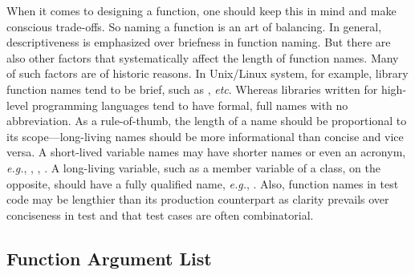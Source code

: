 When it comes to designing a function, one should keep this in mind and make conscious trade-offs.
So naming a function is an art of balancing.
In general, descriptiveness is emphasized over briefness in function naming.
But there are also other factors that systematically affect the length of function names.
Many of such factors are of historic reasons.
In Unix/Linux system, for example, library function names tend to be brief, such as , \textit{etc}.
Whereas libraries written for high-level programming languages tend to have
formal, full names with no abbreviation.
As a rule-of-thumb, the length of a name should be proportional to its scope---long-living names
should be more informational than concise and vice versa.
A short-lived variable names may have shorter names or even an acronym, \textit{e.g.},
, , .
A long-living variable, such as a member variable of a class, on the opposite, should have a fully
qualified name, \textit{e.g.}, .
Also, function names in test code may be lengthier than its production counterpart as clarity
prevails over conciseness in test and that test cases are often combinatorial.

\subsection{Function Argument List}\label{subsec:argument-list}

